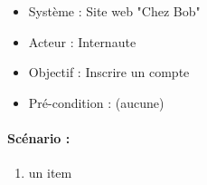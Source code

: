 \begin{boxedminipage}[t]{12cm}
	\begin{itemize}
		\item Système : Site web "Chez Bob"
		\item Acteur : Internaute
		\item Objectif : Inscrire un compte
		\item Pré-condition : (aucune)
	\end{itemize}

	\renewcommand\theenumi{\arabic{enumi}}
	\renewcommand\labelenumi{\theenumi .}
	\renewcommand\theenumii{\Alph{enumii}}
	\renewcommand\labelenumii{(\theenumii)}
	\paragraph{Scénario :} 
	\begin{enumerate}
		\item \label{sc1l1} un item
	\end{enumerate}
\end{boxedminipage}
\newpage

